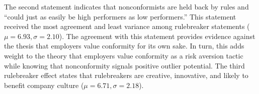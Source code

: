 \documentclass[review]{elsarticle}
\begin{document}
The second statement indicates that nonconformists are held back by rules and ``could just as easily be high performers as low performers.''
This statement received the most agreement and least variance among rulebreaker statements ($\mu = 6.93, \sigma = 2.10$).
The agreement with this statement provides evidence against the thesis that employers value conformity for its own sake.
In turn, this adds weight to the theory that employers value conformity as a risk aversion tactic while knowing that nonconformity signals positive outlier potential.
The third rulebreaker effect states that rulebreakers are creative, innovative, and likely to benefit company culture ($\mu = 6.71, \sigma = 2.18$).

\end{document}

